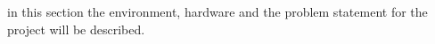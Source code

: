 in this section the environment, hardware and the problem statement for the project will be described.